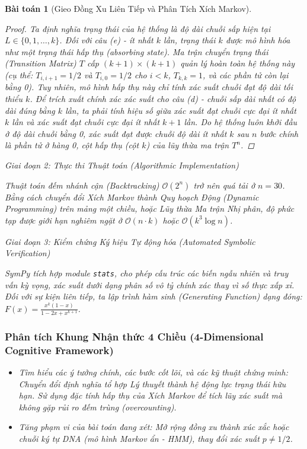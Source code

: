\documentclass{article}
\newtheorem{baitoan}{Bài toán}
\begin{document}
\begin{baitoan}[Gieo Đồng Xu Liên Tiếp và Phân Tích Xích Markov]
\begin{proof}
 Ta định nghĩa trạng thái của hệ thống là độ dài chuỗi sấp hiện tại $L \in \{0, 1, \dots, k\}$. Đối với câu (e) - \textit{ít nhất} $k$ lần, trạng thái $k$ được mô hình hóa như một trạng thái hấp thụ (absorbing state). Ma trận chuyển trạng thái (Transition Matrix) $T$ cấp $(k+1) \times (k+1)$ quản lý hoàn toàn hệ thống này (cụ thể: $T_{i,i+1} = 1/2$ và $T_{i,0} = 1/2$ cho $i<k$, $T_{k,k} = 1$, và các phần tử còn lại bằng 0). Tuy nhiên, mô hình hấp thụ này chỉ tính xác suất chuỗi đạt độ dài tối thiểu $k$. Để trích xuất chính xác xác suất cho câu (d) - \textit{chuỗi sấp dài nhất có độ dài đúng bằng} $k$ lần, ta phải tính hiệu số giữa xác suất đạt chuỗi cực đại ít nhất $k$ lần và xác suất đạt chuỗi cực đại ít nhất $k+1$ lần. Do hệ thống luôn khởi đầu ở độ dài chuỗi bằng 0, xác suất đạt được chuỗi độ dài ít nhất $k$ sau $n$ bước chính là phần tử ở hàng 0, cột hấp thụ (cột $k$) của lũy thừa ma trận $T^n$.
 \end{proof}

\vspace{0.5em}\noindent\emph{Giai đoạn 2: Thực thi Thuật toán (Algorithmic Implementation)}
 
 Thuật toán đếm nhánh cận (Backtracking) $\mathcal{O}(2^n)$ trở nên quá tải ở $n=30$. Bằng cách chuyển đổi Xích Markov thành Quy hoạch Động (Dynamic Programming) trên mảng một chiều, hoặc Lũy thừa Ma trận Nhị phân, độ phức tạp được giới hạn nghiêm ngặt ở $\mathcal{O}(n \cdot k)$ hoặc $\mathcal{O}(k^3 \log n)$.



\vspace{0.5em}\noindent\emph{Giai đoạn 3: Kiểm chứng Ký hiệu Tự động hóa (Automated Symbolic Verification)}
 
 \textsf{SymPy} tích hợp module \texttt{stats}, cho phép cấu trúc các biến ngẫu nhiên và truy vấn kỳ vọng, xác suất dưới dạng phân số vô tỷ chính xác thay vì số thực xấp xỉ. Đối với sự kiện liên tiếp, ta lập trình hàm sinh (Generating Function) dạng đóng: $F(x) = \frac{x^k(1-x)}{1-2x+x^{k+1}}$.



 \subsubsection*{Phân tích Khung Nhận thức 4 Chiều (4-Dimensional Cognitive Framework)}
 \begin{itemize}
 \item \textit{Tìm hiểu các ý tưởng chính, các bước cốt lõi, và các kỹ thuật chứng minh}: Chuyển đổi định nghĩa tổ hợp Lý thuyết thành hệ động lực trạng thái hữu hạn. Sử dụng đặc tính hấp thụ của Xích Markov để tích lũy xác suất mà không gặp rủi ro đếm trùng (overcounting).
 \item \textit{Tăng phạm vi của bài toán đang xét}: Mở rộng đồng xu thành xúc xắc hoặc chuỗi ký tự DNA (mô hình Markov ẩn - HMM), thay đổi xác suất $p \neq 1/2$.
 

\end{itemize}
\end{baitoan}
\end{document}
